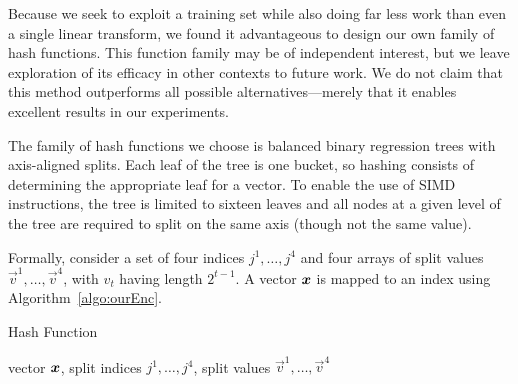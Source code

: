Because we seek to exploit a training set while also doing far less work than even a single linear transform, we found it advantageous to design our own family of hash functions. This function family may be of independent interest, but we leave exploration of its efficacy in other contexts to future work. We do not claim that this method outperforms all possible alternatives---merely that it enables excellent results in our experiments.

The family of hash functions we choose is balanced binary regression trees with axis-aligned splits. Each leaf of the tree is one bucket, so hashing consists of determining the appropriate leaf for a vector. To enable the use of SIMD instructions, the tree is limited to sixteen leaves and all nodes at a given level of the tree are required to split on the same axis (though not the same value).


Formally, consider a set of four indices ${j^1,\ldots,j^4}$ and four arrays of split values $\vec{v}^1,\ldots,\vec{v}^4$, with $v_t$ having length $2^{t-1}$. A vector $\bm{x}$ is mapped to an index using Algorithm~\ref{algo:ourEnc}.
\begin{algorithm}[h]
\caption{\oursp Hash Function} \label{algo:ourEnc}
\begin{algorithmic}[1]
     vector $\bm{x}$, split indices ${j^1,\ldots,j^4}$, split values $\vec{v}^1,\ldots,\vec{v}^4$
      
       
      
     
    \ENDFOR
\end{algorithmic}
\end{algorithm}

